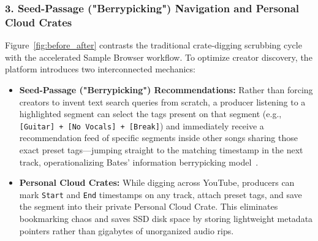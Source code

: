 \subsubsection*{3. Seed-Passage ("Berrypicking") Navigation and Personal Cloud Crates}
Figure~\ref{fig:before_after} contrasts the traditional crate-digging scrubbing cycle with the accelerated Sample Browser workflow. To optimize creator discovery, the platform introduces two interconnected mechanics:
\begin{itemize}
    \item \textbf{Seed-Passage ("Berrypicking") Recommendations:} Rather than forcing creators to invent text search queries from scratch, a producer listening to a highlighted segment can select the tags present on that segment (e.g., \texttt{[Guitar] + [No Vocals] + [Break]}) and immediately receive a recommendation feed of specific segments inside other songs sharing those exact preset tags---jumping straight to the matching timestamp in the next track, operationalizing Bates' information berrypicking model~\cite{ref:bates1989}.
    \item \textbf{Personal Cloud Crates:} While digging across YouTube, producers can mark \texttt{Start} and \texttt{End} timestamps on any track, attach preset tags, and save the segment into their private Personal Cloud Crate. This eliminates bookmarking chaos and saves SSD disk space by storing lightweight metadata pointers rather than gigabytes of unorganized audio rips.
\end{itemize}

